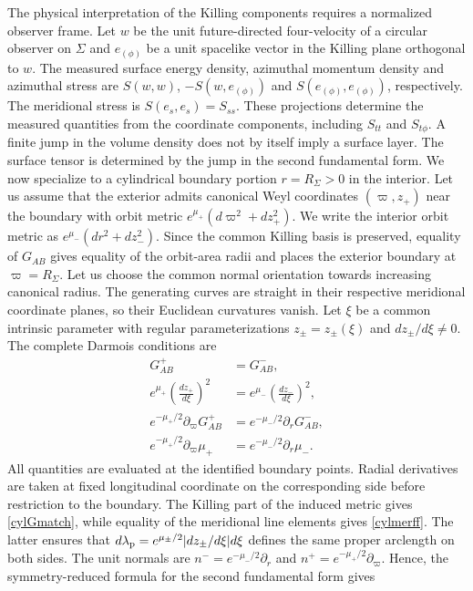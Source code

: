 \documentclass[amsmath,amsfonts,amssymb,aps,pra,superscriptaddress,10pt]{revtex4-2}
\numberwithin{equation}{section}
\theoremstyle{plain}
\theoremstyle{definition}
\theoremstyle{remark}
\theoremstyle{definition}
\begin{document}
The physical interpretation of the Killing components requires a normalized observer frame. Let $w$ be the unit future-directed four-velocity of a circular observer on $\Sigma$ and $e_{(\phi)}$ be a unit spacelike vector in the Killing plane orthogonal to $w$. The measured surface energy density, azimuthal momentum density and azimuthal stress are $S(w,w)$, $-S(w,e_{(\phi)})$ and $S(e_{(\phi)},e_{(\phi)})$, respectively. The meridional stress is $S(e_s,e_s)=S_{ss}$. These projections determine the measured quantities from the coordinate components, including $S_{tt}$ and $S_{t\phi}$. A finite jump in the volume density does not by itself imply a surface layer. The surface tensor is determined by the jump in the second fundamental form. We now specialize to a cylindrical boundary portion $r=R_\Sigma>0$ in the interior. Let us assume that the exterior admits canonical Weyl coordinates $(\varpi,z_+)$ near the boundary with orbit metric $e^{\mu_+}(d\varpi^2+dz_+^2)$. We write the interior orbit metric as $e^{\mu_-}(dr^2+dz_-^2)$. Since the common Killing basis is preserved, equality of $G_{AB}$ gives equality of the orbit-area radii and places the exterior boundary at $\varpi=R_\Sigma$. Let us choose the common normal orientation towards increasing canonical radius. The generating curves are straight in their respective meridional coordinate planes, so their Euclidean curvatures vanish. Let $\xi$ be a common intrinsic parameter  with regular parameterizations $z_\pm=z_\pm(\xi)$ and $dz_\pm/d\xi\neq 0$. The complete Darmois conditions are
\begin{align}
G_{AB}^+&=G_{AB}^-,\label{cylGmatch}\\
e^{\mu_+}\left(\frac{dz_+}{d\xi}\right)^2&=e^{\mu_-}\left(\frac{dz_-}{d\xi}\right)^2,\label{cylmerff}\\
e^{-\mu_+/2}\partial_\varpi G_{AB}^+&=e^{-\mu_-/2}\partial_rG_{AB}^-,
\label{cylnormGmatch}\\
e^{-\mu_+/2}\partial_\varpi\mu_+&=e^{-\mu_-/2}\partial_r\mu_-.
\label{cylmumatch}
\end{align}
All quantities are evaluated at the identified boundary points. Radial derivatives are taken at fixed longitudinal coordinate on the corresponding side before restriction to the boundary. The Killing part of the induced metric gives \eqref{cylGmatch}, while equality of the meridional line elements gives \eqref{cylmerff}. The latter ensures that $d\lambda_{\rm{p}}=e^{\mu_\pm/2}|dz_\pm/d\xi|d\xi$ defines the same proper arclength on both sides. The unit normals are $n^-=e^{-\mu_-/2}\partial_r$ and $n^+=e^{-\mu_+/2}\partial_\varpi$. Hence, the symmetry-reduced formula for the second fundamental form gives
\end{document}
